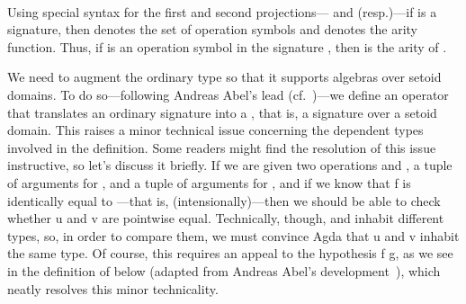 \begin{center}

\AgdaSpace{}%
\AgdaSymbol{:}\AgdaSpace{}%
\AgdaSymbol{(}\AgdaSpace{}%
\AgdaSpace{}%
\AgdaSymbol{:}\AgdaSpace{}%
\AgdaSymbol{)}\AgdaSpace{}%
\AgdaSpace{}%
\AgdaSpace{}%
\AgdaSymbol{(}\AgdaSpace{}%
\AgdaSymbol{(}\AgdaSpace{}%
\AgdaSpace{}%
\AgdaSymbol{))}\\[4pt]
\AgdaSpace{}%
\AgdaSpace{}%
\AgdaSpace{}%
\AgdaSymbol{=}\AgdaSpace{}%
\AgdaFunction{Σ[}\AgdaSpace{}%
\AgdaSpace{}%
\AgdaSpace{}%
\AgdaSpace{}%
\AgdaSpace{}%
\AgdaFunction{]}\AgdaSpace{}%
\AgdaSymbol{(}\AgdaSpace{}%
\AgdaSpace{}%
\AgdaSpace{}%
\AgdaSymbol{)}

\end{center}

Using special syntax for the first and second
projections--- and
 (resp.)---if
 \as{:}    is a signature, then
   denotes the set of operation symbols and    denotes the arity function.
Thus, if  \as{:}    is an operation symbol in the
signature , then     is the arity of .

We need to augment the ordinary  type so that it supports algebras over
setoid domains.
\ifshort\else
To do so---following Andreas Abel's lead (cf.~\cite{Abel:2021})---we
define an operator that translates an ordinary signature into a ,
that is, a signature over a setoid domain.
\fi
This raises a minor technical issue concerning
the dependent types involved in the definition.
\ifshort\else
Some readers might find the resolution of
this issue instructive, so let's discuss it briefly.
\fi
If we are given two operations  and , a tuple  \as{:}     
 of arguments for , and a tuple  \as{:}  
    of arguments for , and if we know that \ab f is identically equal to
---that is,    (intensionally)---then we should be able to
check whether \ab u and \ab v are pointwise equal.  Technically, though,  and
 inhabit different types, so, in order to compare them, we must convince Agda
that \ab u and \ab v inhabit the same type. Of course, this requires an appeal to the
hypothesis \ab f  \ab g, as we see in the definition of  below (adapted
from Andreas Abel's development~\cite{Abel:2021}), which neatly resolves this minor
technicality.


